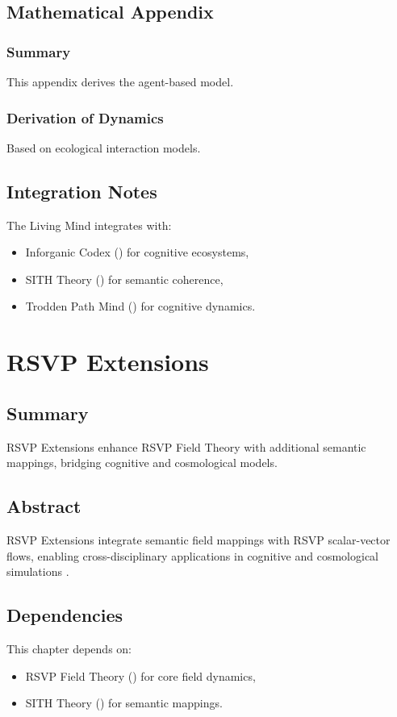 \documentclass[11pt,oneside]{memoir}
\theoremstyle{plain}
\begin{document}
\section{Mathematical Appendix}
\subsection{Summary}
This appendix derives the agent-based model.

\subsection{Derivation of Dynamics}
Based on ecological interaction models.

\section{Integration Notes}
The Living Mind integrates with:
\begin{itemize}
    \item Inforganic Codex () for cognitive ecosystems,
    \item SITH Theory () for semantic coherence,
    \item Trodden Path Mind () for cognitive dynamics.
\end{itemize}

\chapter{RSVP Extensions}
\label{sec:rsvp_extensions}

\section{Summary}
RSVP Extensions enhance RSVP Field Theory with additional semantic mappings, bridging cognitive and cosmological models.

\section{Abstract}
RSVP Extensions integrate semantic field mappings with RSVP scalar-vector flows, enabling cross-disciplinary applications in cognitive and cosmological simulations \cite{evans}.

\section{Dependencies}
This chapter depends on:
\begin{itemize}
    \item RSVP Field Theory () for core field dynamics,
    \item SITH Theory () for semantic mappings.
\end{itemize}
\end{document}
